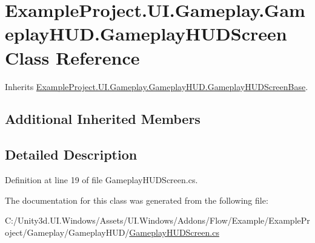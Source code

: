 \hypertarget{class_example_project_1_1_u_i_1_1_gameplay_1_1_gameplay_h_u_d_1_1_gameplay_h_u_d_screen}{}\section{Example\+Project.\+U\+I.\+Gameplay.\+Gameplay\+H\+U\+D.\+Gameplay\+H\+U\+D\+Screen Class Reference}
\label{class_example_project_1_1_u_i_1_1_gameplay_1_1_gameplay_h_u_d_1_1_gameplay_h_u_d_screen}


Inherits \hyperlink{class_example_project_1_1_u_i_1_1_gameplay_1_1_gameplay_h_u_d_1_1_gameplay_h_u_d_screen_base}{Example\+Project.\+U\+I.\+Gameplay.\+Gameplay\+H\+U\+D.\+Gameplay\+H\+U\+D\+Screen\+Base}.

\subsection*{Additional Inherited Members}


\subsection{Detailed Description}


Definition at line 19 of file Gameplay\+H\+U\+D\+Screen.\+cs.



The documentation for this class was generated from the following file\+:\begin{DoxyCompactItemize}
\item 
C\+:/\+Unity3d.\+U\+I.\+Windows/\+Assets/\+U\+I.\+Windows/\+Addons/\+Flow/\+Example/\+Example\+Project/\+Gameplay/\+Gameplay\+H\+U\+D/\hyperlink{_gameplay_h_u_d_screen_8cs}{Gameplay\+H\+U\+D\+Screen.\+cs}\end{DoxyCompactItemize}
